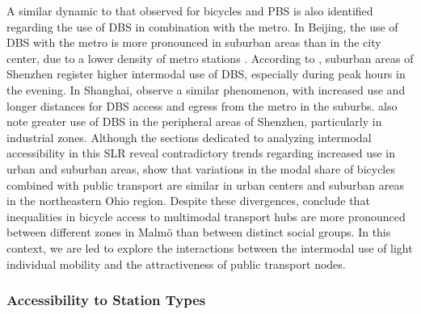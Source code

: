 \begin{refsegment}
A similar dynamic to that observed for bicycles and \acrshort{PBS} is also identified regarding the use of \acrshort{DBS} in combination with the metro. In Beijing, the use of \acrshort{DBS} with the metro is more pronounced in suburban areas than in the city center, due to a lower density of metro stations \textcolor{blue}{\autocite[13]{fan_dockless_2020}}. According to \textcolor{blue}{\textcite[24]{guo_dockless_2021}}, suburban areas of Shenzhen register higher intermodal use of \acrshort{DBS}, especially during peak hours in the evening. In Shanghai, \textcolor{blue}{\textcite[12]{hu_examining_2022}} observe a similar phenomenon, with increased use and longer distances for \acrshort{DBS} access and egress from the metro in the suburbs. \textcolor{blue}{\textcite[389]{guo_role_2021}} also note greater use of \acrshort{DBS} in the peripheral areas of Shenzhen, particularly in industrial zones. Although the sections dedicated to analyzing intermodal accessibility in this \acrshort{SLR} reveal contradictory trends regarding increased use in urban and suburban areas, \textcolor{blue}{\textcite[159]{flamm_changes_2014}} show that variations in the modal share of bicycles combined with public transport are similar in urban centers and suburban areas in the northeastern Ohio region. Despite these divergences, \textcolor{blue}{\textcite[685]{hamidi_inequalities_2019}} conclude that inequalities in bicycle access to multimodal transport hubs are more pronounced between different zones in Malmö than between distinct social groups. In this context, we are led to explore the interactions between the intermodal use of light individual mobility and the attractiveness of public transport nodes.%

\subsubsection*{Accessibility to Station Types
    \label{chap2:accessibility-station-types}
    }


\end{refsegment}

